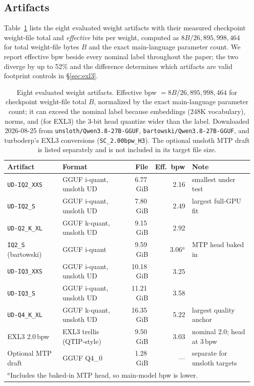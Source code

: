 \documentclass[11pt]{article}
\newcommand{\q}[1]{\texttt{#1}}
\begin{document}
\subsection{Artifacts}
\label{sec:artifacts}

Table~\ref{tab:artifacts} lists the eight evaluated weight artifacts with their
measured checkpoint weight-file total and \emph{effective} bits per weight,
computed as $8B/26{,}895{,}998{,}464$ for total weight-file bytes $B$ and the
exact main-language parameter count. We report effective bpw beside every
nominal label throughout the paper; the two diverge by up to 52\% and the
difference determines which artifacts are valid footprint controls in
\S\ref{sec:exl3}.

\begin{table}[t]
\centering
\small
\caption{Eight evaluated weight artifacts. Effective bpw
$=8B/26{,}895{,}998{,}464$ for checkpoint weight-file total $B$, normalized
by the exact main-language parameter count; it can exceed the nominal label because embeddings
(248K vocabulary), norms, and (for EXL3) the 3-bit head quantize wider than the
label. Downloaded 2026-08-25 from \q{unsloth/Qwen3.8-27B-GGUF},
\q{bartowski/Qwen3.8-27B-GGUF}, and turboderp's EXL3 conversions
(\q{SC\_2.00bpw\_H3}). The optional unsloth MTP draft is listed separately and
is not included in its target file size.}
\label{tab:artifacts}
\setlength{\tabcolsep}{4pt}
\begin{tabular}{llrrl}
\toprule
Artifact & Format & File & Eff.\ bpw & Note \\
\midrule
\q{UD-IQ2\_XXS} & GGUF i-quant, unsloth UD & 6.77\,GiB & 2.16 & smallest under test \\
\q{UD-IQ2\_S} & GGUF i-quant, unsloth UD & 7.80\,GiB & 2.49 & largest full-GPU fit \\
\q{UD-Q2\_K\_XL} & GGUF k-quant, unsloth UD & 9.15\,GiB & 2.92 & \\
\q{IQ2\_S} (bartowski) & GGUF i-quant & 9.59\,GiB & 3.06$^{a}$ & MTP head baked in \\
\q{UD-IQ3\_XXS} & GGUF i-quant, unsloth UD & 10.18\,GiB & 3.25 & \\
\q{UD-IQ3\_S} & GGUF i-quant, unsloth UD & 11.21\,GiB & 3.58 & \\
\q{UD-Q4\_K\_XL} & GGUF k-quant, unsloth UD & 16.35\,GiB & 5.22 & largest quality anchor \\
EXL3 2.0\,bpw & EXL3 trellis (QTIP-style) & 9.50\,GiB & 3.03 & nominal 2.0; head at 3\,bpw \\
\midrule
Optional MTP draft & GGUF Q4\_0 & 1.28\,GiB & --- & separate for unsloth targets \\
\bottomrule
\multicolumn{5}{l}{\footnotesize $^{a}$Includes the baked-in MTP head, so main-model bpw is lower.}
\end{tabular}
\end{table}
\end{document}
